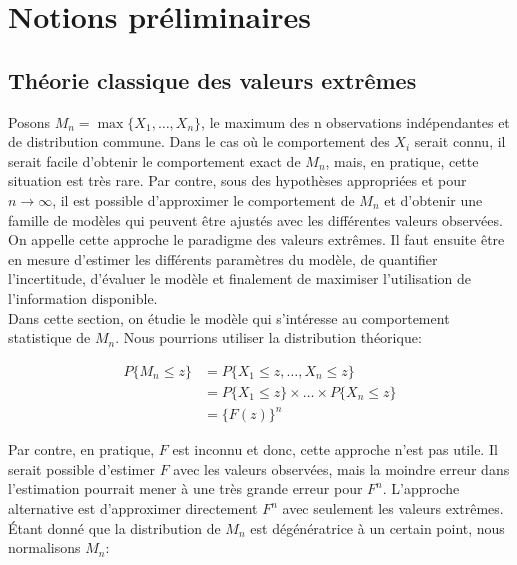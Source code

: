 
\chapter{Notions préliminaires}
\label{chap:notions} 

\section{Théorie classique des valeurs extrêmes}
\label{sec:classique}

Posons $M_n = \max\{X_1, \dots, X_n\}$, le maximum des n observations indépendantes et de distribution commune. Dans le cas où le comportement des $X_i$ serait connu, il serait facile d'obtenir le comportement exact de $M_n$, mais, en pratique, cette situation est très rare. Par contre, sous des hypothèses appropriées et pour ${n \to \infty}$, il est possible d'approximer le comportement de $M_n$ et d'obtenir une famille de modèles qui peuvent être ajustés avec les différentes valeurs observées. On appelle cette approche le paradigme des valeurs extrêmes. Il faut ensuite être en mesure d'estimer les différents paramètres du modèle, de quantifier l'incertitude, d'évaluer le modèle et finalement de maximiser l'utilisation de l'information disponible.\\

Dans cette section, on étudie le modèle qui s'intéresse au comportement statistique de $M_n$. Nous pourrions utiliser la distribution théorique:

\begin{equation}\label{eq:1.1.1}
\begin{split}
P\{M_n \le z\} &= P\{X_1 \le z, \dots, X_n \le z\} \\
              &= P\{X_1 \le z\} \times \dots \times P\{X_n \le z\} \\
              &= \{F(z)\}^n
\end{split}
\end{equation}

Par contre, en pratique, $F$ est inconnu et donc, cette approche n'est pas utile. Il serait possible d'estimer $F$ avec les valeurs observées, mais la moindre erreur dans l'estimation pourrait mener à une très grande erreur pour $F^n$. L'approche alternative est d'approximer directement $F^n$ avec seulement les valeurs extrêmes. Étant donné que la distribution de $M_n$ est dégénératrice à un certain point, nous normalisons $M_n$: 

